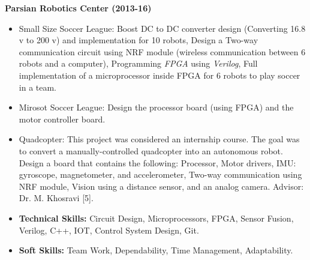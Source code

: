 \begin{cventries}
{\begin{cvitems}
\begin{itemize}[label= - ]
      \end{itemize}
      \item{\textbf{Parsian Robotics Center (2013-16)}}
      \begin{itemize}[label= - ] %
        \item {Small Size Soccer League:	Boost DC to DC converter design (Converting 16.8 v to 200 v) and implementation for 10 robots,	Design a Two-way communication circuit using NRF module (wireless communication between 6 robots and a computer), Programming \textit{FPGA} using \textit{Verilog}, Full implementation of a microprocessor inside FPGA for 6 robots to play soccer in a team.}
            \item {Mirosot Soccer League:	Design the processor board (using FPGA) and the motor controller board.}
            \item{Quadcopter: This project was considered an internship course. The goal was to convert a manually-controlled quadcopter into an autonomous robot. Design a board that contains the following: Processor, Motor drivers, IMU: gyroscope, magnetometer, and accelerometer, Two-way communication using NRF module, Vision using a distance sensor, and an analog camera. Advisor: Dr. M. Khosravi [5].}
            \item {\textbf{Technical Skills:} Circuit Design, Microprocessors, FPGA, Sensor Fusion, Verilog, C++, IOT, Control System Design, Git.}
        \item {\textbf{Soft Skills:} Team Work, Dependability, Time Management, Adaptability.}
      \end{itemize}
  \end{cvitems}
}

\end{cventries}


